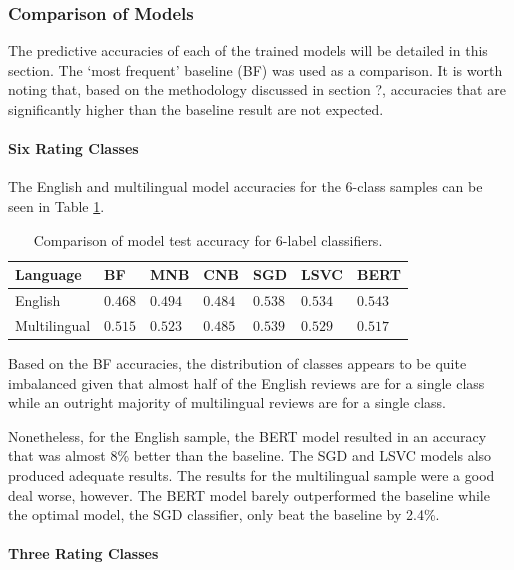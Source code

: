 \subsubsection{Comparison of Models}

The predictive accuracies of each of the trained models will be detailed in this section. The `most frequent' baseline (BF) was used as a comparison. It is worth noting that, based on the methodology discussed in section ?, accuracies that are significantly higher than the baseline result are not expected.

\paragraph{Six Rating Classes}

The English and multilingual model accuracies for the 6-class samples can be seen in Table \ref{tab:Res_PU_Comp6}.

\begin{table}[ht]
    \centering
    \begin{tabular}{l | l l l l l l}
        \toprule
        \textbf{Language} & \textbf{BF} & \textbf{MNB} & \textbf{CNB} & \textbf{SGD} & \textbf{LSVC} & \textbf{BERT}\\\midrule
        English&$0.468$&$0.494$&$0.484$&$0.538$&$0.534$&$\mathbf{0.543}$\\
        Multilingual&$0.515$&$0.523$&$0.485$&$\mathbf{0.539}$&$0.529$&$0.517$\\
        \bottomrule
    \end{tabular}
    \caption{Comparison of model test accuracy for 6-label classifiers.}
    \label{tab:Res_PU_Comp6}
\end{table}

Based on the BF accuracies, the distribution of classes appears to be quite imbalanced given that almost half of the English reviews are for a single class while an outright majority of multilingual reviews are for a single class.

Nonetheless, for the English sample, the BERT model resulted in an accuracy that was almost 8\% better than the baseline. The SGD and LSVC models also produced adequate results. The results for the multilingual sample were a good deal worse, however. The BERT model barely outperformed the baseline while the optimal model, the SGD classifier, only beat the baseline by 2.4\%.

\paragraph{Three Rating Classes}

